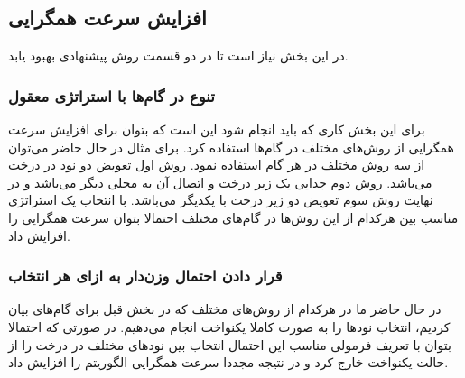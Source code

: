 \subsection{افزایش سرعت همگرایی }
در این بخش نیاز است تا در دو قسمت روش پیشنهادی بهبود یابد.
\subsubsection{تنوع در گام‌ها با استراتژی معقول}
برای این بخش کاری که باید انجام شود این است که بتوان برای افزایش سرعت همگرایی از روش‌های مختلف در گام‌ها استفاده کرد. برای مثال در حال حاضر می‌توان از سه روش مختلف در هر گام استفاده نمود. روش اول تعویض دو نود در درخت می‌باشد. روش دوم جدایی یک زیر درخت و اتصال آن به محلی دیگر می‌باشد و  در نهایت روش سوم تعویض دو زیر درخت با یکدیگر می‌باشد. با انتخاب یک استراتژی مناسب بین هرکدام از این روش‌ها در گام‌های مختلف احتمالا بتوان سرعت همگرایی را افزایش داد.

\subsubsection{قرار دادن احتمال وزن‌دار به ازای هر انتخاب}
در حال حاضر ما در هرکدام از روش‌های مختلف که در بخش قبل برای گام‌های  بیان کردیم، انتخاب نودها را به صورت کاملا یکنواخت انجام می‌دهیم. در صورتی که احتمالا بتوان با تعریف فرمولی مناسب این احتمال انتخاب بین نودهای مختلف در درخت را از حالت یکنواخت خارج کرد و در نتیجه مجددا سرعت همگرایی الگوریتم را افزایش داد.
